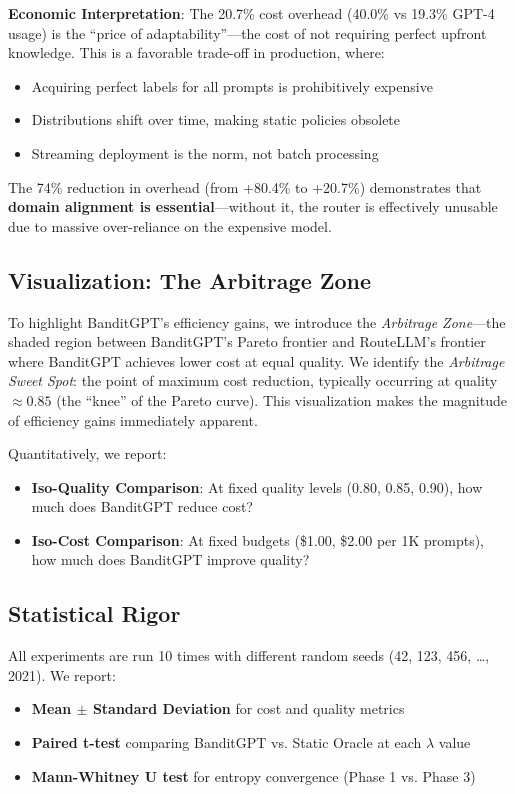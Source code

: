 \textbf{Economic Interpretation}: The 20.7\% cost overhead (40.0\% vs 19.3\% GPT-4 usage) is the ``price of adaptability''—the cost of not requiring perfect upfront knowledge. This is a favorable trade-off in production, where:
\begin{itemize}
    \item Acquiring perfect labels for all prompts is prohibitively expensive
    \item Distributions shift over time, making static policies obsolete
    \item Streaming deployment is the norm, not batch processing
\end{itemize}

The 74\% reduction in overhead (from +80.4\% to +20.7\%) demonstrates that \textbf{domain alignment is essential}—without it, the router is effectively unusable due to massive over-reliance on the expensive model.

\subsection{Visualization: The Arbitrage Zone}

To highlight BanditGPT's efficiency gains, we introduce the \emph{Arbitrage Zone}—the shaded region between BanditGPT's Pareto frontier and RouteLLM's frontier where BanditGPT achieves lower cost at equal quality. We identify the \emph{Arbitrage Sweet Spot}: the point of maximum cost reduction, typically occurring at quality $\approx 0.85$ (the ``knee'' of the Pareto curve). This visualization makes the magnitude of efficiency gains immediately apparent.

Quantitatively, we report:
\begin{itemize}
    \item \textbf{Iso-Quality Comparison}: At fixed quality levels (0.80, 0.85, 0.90), how much does BanditGPT reduce cost?
    \item \textbf{Iso-Cost Comparison}: At fixed budgets (\$1.00, \$2.00 per 1K prompts), how much does BanditGPT improve quality?
\end{itemize}

\subsection{Statistical Rigor}

All experiments are run 10 times with different random seeds (42, 123, 456, \ldots, 2021). We report:
\begin{itemize}
    \item \textbf{Mean $\pm$ Standard Deviation} for cost and quality metrics
    \item \textbf{Paired t-test} comparing BanditGPT vs. Static Oracle at each $\lambda$ value
    \item \textbf{Mann-Whitney U test} for entropy convergence (Phase 1 vs. Phase 3)
\end{itemize}


